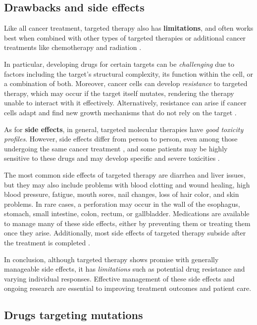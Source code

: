 \subsection{Drawbacks and side effects}

Like all cancer treatment, targeted therapy also has \textbf{limitations}, and often works best when combined with other types of targeted therapies or additional cancer treatments like chemotherapy and radiation \cite{target_therapy1}.

In particular, developing drugs for certain targets can be \textit{challenging} due to factors including the target's structural complexity, its function within the cell, or a combination of both. Moreover, cancer cells can develop \textit{resistance} to targeted therapy, which may occur if the target itself mutates, rendering the therapy unable to interact with it effectively. Alternatively, resistance can arise if cancer cells adapt and find new growth mechanisms that do not rely on the target \cite{target_therapy1}.

As for \textbf{side effects}, in general, targeted molecular therapies have \textit{good toxicity profiles}. However, side effects differ from person to person, even among those undergoing the same cancer treatment \cite{nih_se}, and some patients may be highly sensitive to these drugs and may develop specific and severe toxicities \cite{se_tt}.

The most common side effects of targeted therapy are diarrhea and liver issues, but they may also include problems with blood clotting and wound healing, high blood pressure, fatigue, mouth sores, nail changes, loss of hair color, and skin problems. In rare cases, a perforation may occur in the wall of the esophagus, stomach, small intestine, colon, rectum, or gallbladder. Medications are available to manage many of these side effects, either by preventing them or treating them once they arise. Additionally, most side effects of targeted therapy subside after the treatment is completed \cite{target_therapy1}.

In conclusion, although targeted therapy shows promise with generally manageable side effects, it has \textit{limitations} such as potential drug resistance and varying individual responses. Effective management of these side effects and ongoing research are essential to improving treatment outcomes and patient care.

\subsection{Drugs targeting mutations}

